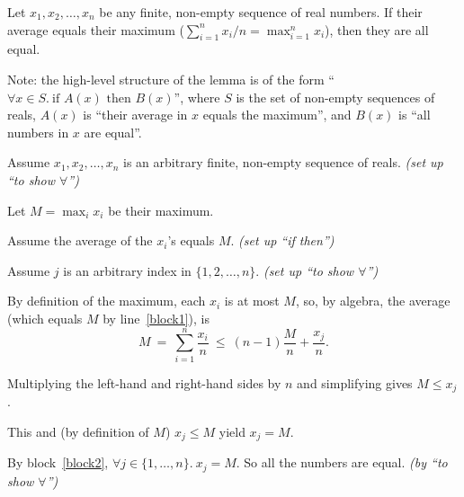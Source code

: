 \documentclass[11pt]{article}
\begin{document}
\begin{problems}

\problem

  \begin{lemma}\label{lemma: ave}
    Let $x_1,x_2,\ldots,x_n$ be any finite, non-empty sequence of real numbers.
    If their average equals their maximum
    ($\sum_{i=1}^n x_i/n = \max_{i=1}^n x_i$),
    then they are all equal.
  \end{lemma}

  \smallskip

  Note: the high-level structure of the lemma is of the form
  ``$\forall x\in S.~\text{if } A(x) \text{ then } B(x)$'',
  where $S$ is the set of non-empty sequences of reals,
  $A(x)$ is ``their average in $x$ equals the maximum'',
  and $B(x)$ is ``all numbers in $x$ are equal''.

  \begin{longFormProof}
    \begin{block}[block0]
      {Assume $x_1, x_2,\ldots, x_n$ is an arbitrary finite, non-empty sequence of reals.
      \hfill\emph{(set up ``to show $\forall$'')} }
  
      \step Let $M = \max_i x_i$ be their maximum.

      \begin{block}[block1]
        {Assume the average of the $x_i$'s equals $M$.
        \hfill\emph{(set up ``if then'')}}

        \begin{block}[block2]
          {Assume $j$ is an arbitrary index in $\{1,2,\ldots,n\}$.
          \hfill\emph{(set up ``to show $\forall$'')}}

          \step By definition of the maximum, each $x_i$ is at most $M$, 
          so, by algebra, the average (which equals $M$ by line~\ref{block1}),
          is 
          \[
          M ~=~ \sum_{i=1}^n \frac{x_i}{n} ~\le~ (n-1) \frac{M}{n} + \frac{x_j}{n}. 
          \]

          \step Multiplying the left-hand and right-hand sides by $n$ and simplifying gives
          \(
          M \le x_j
          \).
  
          \step This and (by definition of $M$) $x_j \le M$ yield $x_j = M$.
        \end{block}

        \step By block~\ref{block2}, $\forall j\in\{1,\ldots,n\}.~ x_j = M$.
        So all the numbers are equal.
        \hfill\emph{(by ``to show $\forall$'')}
      \end{block}


\end{block}
\end{longFormProof}
\end{problems}
\end{document}
